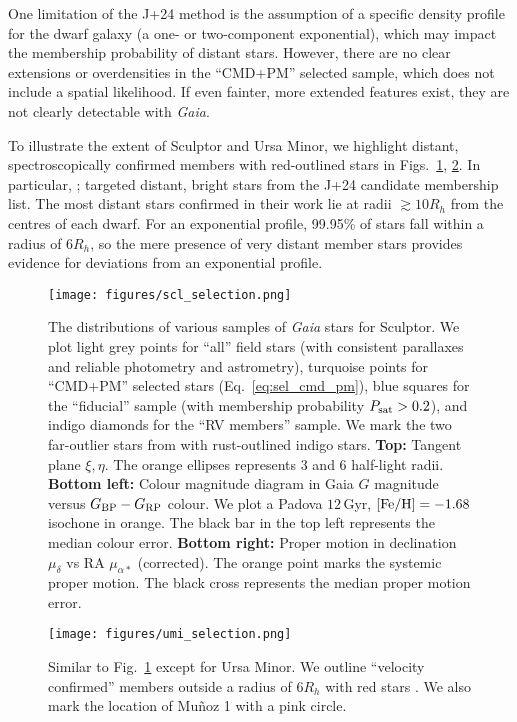 One limitation of the J+24 method is the assumption of a specific
density profile for the dwarf galaxy (a one- or two-component
exponential), which may impact the membership probability of distant
stars. However, there are no clear extensions or overdensities in the
``CMD+PM'' selected sample, which does not include a spatial likelihood.
If even fainter, more extended features exist, they are not clearly
detectable with \emph{Gaia}.

To illustrate the extent of Sculptor and Ursa Minor, we highlight
distant, spectroscopically confirmed members with red-outlined stars in
Figs.~\ref{fig:scl_selection}, \ref{fig:umi_selection}. In particular,
\citet{sestito+2023a}; \citet{sestito+2023b} targeted distant, bright
stars from the J+24 candidate membership list. The most distant stars
confirmed in their work lie at radii \(\gtrsim 10 R_h\) from the centres
of each dwarf. For an exponential profile, 99.95\% of stars fall within
a radius of \(6R_h\), so the mere presence of very distant member stars
provides evidence for deviations from an exponential profile.

\begin{figure}
\centering
\texttt{[image: figures/scl\_selection.png]}
\caption[Sculptor sample selection]{The distributions of various samples
of \emph{Gaia} stars for Sculptor. We plot light grey points for ``all''
field stars (with consistent parallaxes and reliable photometry and
astrometry), turquoise points for ``CMD+PM'' selected stars
(Eq.~\ref{eq:sel_cmd_pm}), blue squares for the ``fiducial'' sample
(with membership probability \(P_{\rm sat} > 0.2\)), and indigo diamonds
for the ``RV members'' sample. We mark the two far-outlier stars from
\citet{sestito+2023a} with rust-outlined indigo stars. \textbf{Top:}
Tangent plane \(\xi, \eta\). The orange ellipses represents 3 and 6
half-light radii. \textbf{Bottom left:} Colour magnitude diagram in Gaia
\(G\) magnitude versus \(G_{\rm BP} - G_{\rm RP}\) colour. We plot a
Padova \(12\,\)Gyr, \({\rm [Fe/H] }=-1.68\) isochone in orange. The
black bar in the top left represents the median colour error.
\textbf{Bottom right:} Proper motion in declination \(\mu_\delta\) vs RA
\(\mu_{\alpha*}\) (corrected). The orange point marks the systemic
\citet{MV2020b} proper motion. The black cross represents the median
proper motion error.}\label{fig:scl_selection}
\end{figure}

\begin{figure}
\centering
\texttt{[image: figures/umi\_selection.png]}
\caption[Ursa Minor sample selection]{Similar to
Fig.~\ref{fig:scl_selection} except for Ursa Minor. We outline
``velocity confirmed'' members outside a radius of \(6R_h\) with red
stars \citep[from][]{sestito+2023b, pace+2020, spencer+2018}. We also
mark the location of Muñoz 1 with a pink
circle.}\label{fig:umi_selection}
\end{figure}

